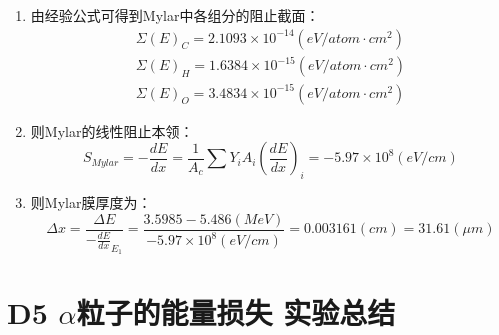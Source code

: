 \documentclass[dvipsnames, svgnames,a4paper,11pt]{article}
\begin{document}
\begin{itemize}
\begin{enumerate}
					\item 由经验公式可得到Mylar中各组分的阻止截面：
						\begin{align*}
							\Sigma(E)_{C} = 2.1093 \times 10^{-14} (eV/atom \cdot cm^2)	\\
							\Sigma(E)_{H} = 1.6384 \times 10^{-15} (eV/atom \cdot cm^2)	\\
							\Sigma(E)_{O} = 3.4834 \times 10^{-15} (eV/atom \cdot cm^2)	
						\end{align*}

					
					\item 则Mylar的线性阻止本领：
						\[
							S_{Mylar} = -\frac{d E}{d x} = \frac{1}{A_c} \sum Y_i A_i (\frac{d E}{d x})_i = -5.97 \times 10^{8} (eV/cm)
						\]

					\item 则Mylar膜厚度为：
						\[
							\Delta x = \frac{\Delta E}{-\frac{d E}{d x}_{E_1}} = \frac{3.5985 - 5.486 (MeV)}{-5.97 \times 10^{8} (eV/cm)}  = 0.003161 (cm) = 31.61 (\mu m)
						\]
					
				\end{enumerate}








		\end{itemize}




		



	






\clearpage
\section{D5 \quad $\alpha$粒子的能量损失 \quad\heiti 实验总结}
\end{document}
